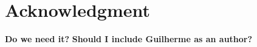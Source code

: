 \section*{Acknowledgment}

\textbf{Do we need it?}
\textbf{Should I include Guilherme as an author?}
